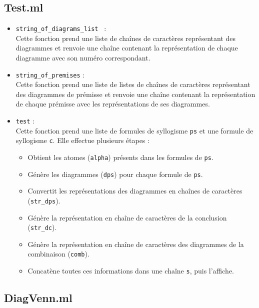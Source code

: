 \documentclass{article}
\begin{document}
\subsection{\textbf{Test.ml}}
\begin{itemize}
    \item \texttt{string\_of\_diagrams\_list } : \\
    Cette fonction prend une liste de chaînes de caractères représentant des diagrammes et renvoie une chaîne contenant la représentation de chaque diagramme avec son numéro correspondant.
    
    \item \texttt{string\_of\_premises} : \\
    Cette fonction prend une liste de listes de chaînes de caractères représentant des diagrammes de prémisse et renvoie une chaîne contenant la représentation de chaque prémisse avec les représentations de ses diagrammes.
    
    \item \texttt{test} : \\
    Cette fonction prend une liste de formules de syllogisme \texttt{ps} et une formule de syllogisme \texttt{c}. Elle effectue plusieurs étapes :
        \begin{itemize}
            \item Obtient les atomes (\texttt{alpha}) présents dans les formules de \texttt{ps}.
            \item Génère les diagrammes (\texttt{dps}) pour chaque formule de \texttt{ps}.
            \item Convertit les représentations des diagrammes en chaînes de caractères (\texttt{str\_dps}).
            \item Génère la représentation en chaîne de caractères de la conclusion (\texttt{str\_dc}).
            \item Génère la représentation en chaîne de caractères des diagrammes de la combinaison (\texttt{comb}).
            \item Concatène toutes ces informations dans une chaîne \texttt{s}, puis l'affiche.
        \end{itemize}
\end{itemize}
\newpage

\subsection{\textbf{DiagVenn.ml}}
\end{document}
